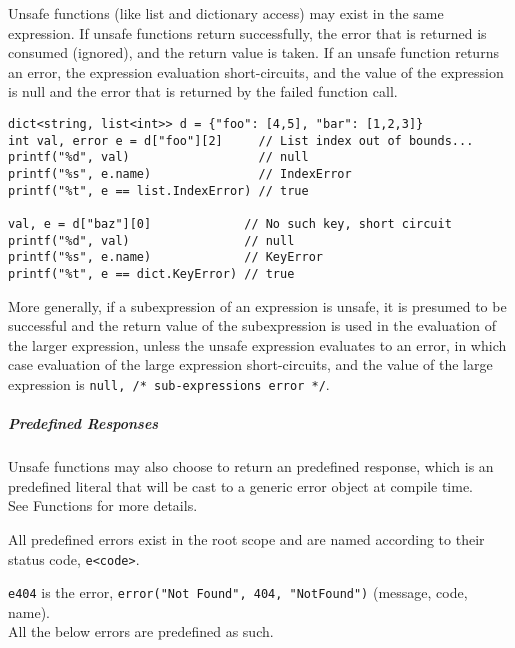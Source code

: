 \documentclass[]{article}
\begin{document}
Unsafe functions (like list and dictionary access) may exist in the same
expression. If unsafe functions return successfully, the error that is
returned is consumed (ignored), and the return value is taken. If an
unsafe function returns an error, the expression evaluation
short-circuits, and the value of the expression is null and the error
that is returned by the failed function call.

\begin{verbatim}
dict<string, list<int>> d = {"foo": [4,5], "bar": [1,2,3]}
int val, error e = d["foo"][2]     // List index out of bounds...
printf("%d", val)                  // null
printf("%s", e.name)               // IndexError
printf("%t", e == list.IndexError) // true

val, e = d["baz"][0]             // No such key, short circuit
printf("%d", val)                // null
printf("%s", e.name)             // KeyError
printf("%t", e == dict.KeyError) // true
\end{verbatim}

More generally, if a subexpression of an expression is unsafe, it is
presumed to be successful and the return value of the subexpression is
used in the evaluation of the larger expression, unless the unsafe
expression evaluates to an error, in which case evaluation of the large
expression short-circuits, and the value of the large expression is
\texttt{null, /* sub-expression\textquotesingle{}s error */}.

\subparagraph{Predefined Responses}\label{predefined-responses}

Unsafe functions may also choose to return an predefined response, which
is an predefined literal that will be cast to a generic error object at
compile time.\\See Functions for more details.

All predefined errors exist in the root scope and are named according to
their status code, \texttt{e\textless{}code\textgreater{}}.

\texttt{e404} is the error, \texttt{error("Not Found", 404, "NotFound")}
(message, code, name).\\All the below errors are predefined as such.
\end{document}
